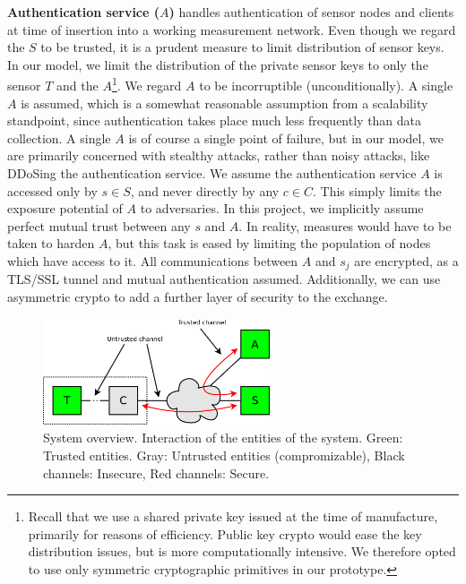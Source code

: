 \documentclass[10pt,a4paper]{article}
\begin{document}
\begin{description}
\item \textbf{Authentication service ($A$)} handles authentication of sensor nodes and clients at time of insertion into a working measurement network. Even though we regard the $S$ to be trusted, it is a prudent measure to limit distribution of sensor keys. In our model, we limit the distribution of the private sensor keys to only the sensor $T$ and the $A$\footnote{Recall that we use a shared private key issued at the time of manufacture, primarily for reasons of efficiency. Public key crypto would ease the key distribution issues, but is more computationally intensive. We therefore opted to use only symmetric cryptographic primitives in our prototype.}. We regard $A$ to be incorruptible (unconditionally). A single $A$ is assumed, which is a somewhat reasonable assumption from a scalability standpoint, since authentication takes place much less frequently than data collection. A single $A$ is of course a single point of failure, but in our model, we are primarily concerned with stealthy attacks, rather than noisy attacks, like DDoSing the authentication service.
We assume the authentication service $A$ is accessed only by $s \in S$, and never directly by any $c \in C$. This simply limits the exposure potential of $A$ to adversaries. In this project, we implicitly assume perfect mutual trust between any $s$ and $A$. In reality, measures would have to be taken to harden $A$, but this task is eased by limiting the population of nodes which have access to it. All communications between $A$ and $s_j$ are encrypted, as a TLS/SSL tunnel and mutual authentication assumed. Additionally, we can use asymmetric crypto to add a further layer of security to the exchange.
\end{description}

\begin{figure}
\begin{center}
\includegraphics[width=0.6\textwidth]{figures/sys-overview.png} 
\end{center}
\caption{System overview. Interaction of the entities of the system. Green: Trusted entities. Gray: Untrusted entities (compromizable), Black channels: Insecure, Red channels: Secure.}
\label{fig:sys-overview}
\end{figure}
\end{document}
